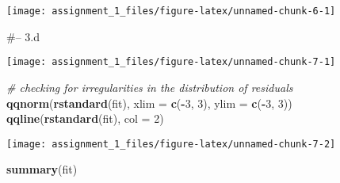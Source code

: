 \documentclass[
]{article}
\newenvironment{Shaded}{\begin{snugshade}}{\end{snugshade}}
\newcommand{\CommentTok}[1]{\textcolor[rgb]{0.56,0.35,0.01}{\textit{#1}}}
\newcommand{\DataTypeTok}[1]{\textcolor[rgb]{0.13,0.29,0.53}{#1}}
\newcommand{\DecValTok}[1]{\textcolor[rgb]{0.00,0.00,0.81}{#1}}
\newcommand{\KeywordTok}[1]{\textcolor[rgb]{0.13,0.29,0.53}{\textbf{#1}}}
\newcommand{\NormalTok}[1]{#1}
\newcommand{\OperatorTok}[1]{\textcolor[rgb]{0.81,0.36,0.00}{\textbf{#1}}}
\newcommand{\StringTok}[1]{\textcolor[rgb]{0.31,0.60,0.02}{#1}}
\begin{document}
\begin{center}\texttt{[image: assignment\_1\_files/figure-latex/unnamed-chunk-6-1]} \end{center}

\#-- 3.d

\begin{Shaded}
\end{Shaded}

\begin{center}\texttt{[image: assignment\_1\_files/figure-latex/unnamed-chunk-7-1]} \end{center}

\begin{Shaded}
\begin{Highlighting}[]
\CommentTok{# checking for irregularities in the distribution of residuals}
\KeywordTok{qqnorm}\NormalTok{(}\KeywordTok{rstandard}\NormalTok{(fit), }\DataTypeTok{xlim =} \KeywordTok{c}\NormalTok{(}\OperatorTok{-}\DecValTok{3}\NormalTok{, }\DecValTok{3}\NormalTok{), }\DataTypeTok{ylim =} \KeywordTok{c}\NormalTok{(}\OperatorTok{-}\DecValTok{3}\NormalTok{, }\DecValTok{3}\NormalTok{))}
\KeywordTok{qqline}\NormalTok{(}\KeywordTok{rstandard}\NormalTok{(fit), }\DataTypeTok{col =} \DecValTok{2}\NormalTok{)}
\end{Highlighting}
\end{Shaded}

\begin{center}\texttt{[image: assignment\_1\_files/figure-latex/unnamed-chunk-7-2]} \end{center}

\begin{Shaded}
\begin{Highlighting}[]
\KeywordTok{summary}\NormalTok{(fit)}
\end{Highlighting}
\end{Shaded}
\end{document}
